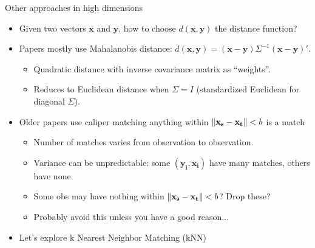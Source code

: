 \documentclass[aspectratio=169,11pt]{beamer}
\begin{document}
\begin{frame}{Other approaches in high dimensions}
\begin{itemize}
\item Given two vectors $\mathbf{x}$ and $\mathbf{y}$, how to choose $d(\mathbf{x},\mathbf{y})$ the \alert{distance} function?
\item Papers mostly use \alert{Mahalanobis distance}: $d(\mathbf{x},\mathbf{y}) = (\mathbf{x}-\mathbf{y}) \Sigma^{-1} (\mathbf{x}-\mathbf{y})'$.
\begin{itemize}
\item Quadratic distance with inverse covariance matrix as ``weights''.
\item Reduces to Euclidean distance when $\Sigma=I$ (standardized Euclidean for diagonal $\Sigma$).
\end{itemize}
\item Older papers use \alert{caliper matching} anything within $\lVert\mathbf{x_s} -\mathbf{x_t}\rVert<b$ is a match
\begin{itemize}
\item Number of matches varies from observation to observation.
\item Variance can be unpredictable: some $(\mathbf{y_i},\mathbf{x_i})$ have many matches, others have none
\item Some obs may have nothing within $\lVert\mathbf{x_s} -\mathbf{x_t}\rVert<b$? Drop these?
\item Probably avoid this unless you have a good reason...
\end{itemize}
\item Let's explore \alert{k Nearest Neighbor Matching} (kNN)
\end{itemize}
\end{frame}
\end{document}
